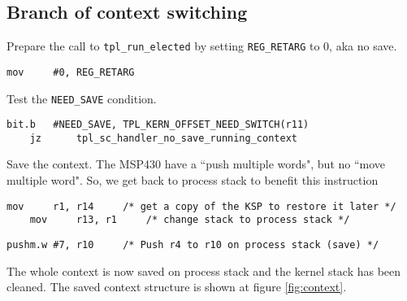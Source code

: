 \documentclass[11pt, oneside]{article}   	%
\begin{document}
\subsection{Branch of context switching}

Prepare the call to \lstinline{tpl_run_elected} by setting \lstinline{REG_RETARG} to 0, aka no save.
\begin{lstlisting}[backgroundcolor=\color{red!15}]
    mov     #0, REG_RETARG
\end{lstlisting}

Test the \lstinline{NEED_SAVE} condition.

\begin{lstlisting}[backgroundcolor=\color{red!15}]
    bit.b   #NEED_SAVE, TPL_KERN_OFFSET_NEED_SWITCH(r11)
    jz      tpl_sc_handler_no_save_running_context
\end{lstlisting}
Save the context. The MSP430 have a ``push multiple words", but no ``move multiple word". So, we get back to process stack to benefit this instruction

\begin{lstlisting}[backgroundcolor=\color{red!15}]
    mov     r1, r14     /* get a copy of the KSP to restore it later */
    mov     r13, r1     /* change stack to process stack */	
\end{lstlisting}
\vspace{-1em}
\begin{lstlisting}[backgroundcolor=\color{yellow!15}]
    pushm.w #7, r10     /* Push r4 to r10 on process stack (save) */
\end{lstlisting}


The whole context is now saved on process stack and the kernel stack has been cleaned. The saved context structure is shown at figure \ref{fig:context}.
\end{document}
